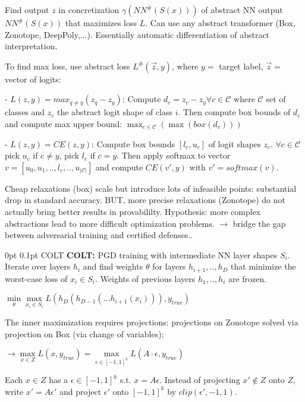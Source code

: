 \documentclass[11pt,landscape,a4paper,fleqn]{article}
\makeatletter
\renewcommand{\subsection}{\@startsection{subsection}{1}{0mm}%
                                {0pt}%
                                {0.1pt}%
                            	{\color{myorange2}\sffamily\small}}
\makeatother
\begin{document}
\begin{multicols*}{4}
Find output $z$ in concretization $\gamma(NN^\#(S(x)))$ of abstract NN output $NN^\#(S(x))$ that maximizes loss $L$. Can use any abstract transformer (Box, Zonotope, DeepPoly,...). {Essentially automatic differentiation of abstract interpretation.}

To find max loss, use abstract loss $L^\#(\vec{z}, y)$, where $y = $ target label, $\vec{z} = $ vector of logits:
\vspace*{1mm}

- $L(z, y) = max_{q \neq y} (z_q - z_y)$: Compute {$d_c = z_c - z_y \forall c \in \mathcal{C}$} where $\mathcal{C}$ set of classes and $z_c$ the abstract logit shape of class $i$. Then compute box bounds of $d_c$ and compute max upper bound: {$\max_{c \in \mathcal{C}}(\max(box(d_c)))$}

- $L(z,y) = CE(z,y)$: Compute box bounds $[l_c, u_c]$ of logit shapes $z_c$. $\forall c \in \mathcal{C}$ pick $u_c$ if $c \neq y$, pick $l_c$ if $c = y$. Then {apply softmax to vector $v = [u_0, u_1,.., l_c,.., u_{|\mathcal{C}|}]$ and compute $CE(v', y)$ with $v' = softmax(v)$.}

Cheap relaxations (box) scale but introduce lots of infeasible points: substantial drop in standard accuracy.
BUT, more precise relaxations (Zonotope) do not actually bring better results in provabililty. Hypothesis: more complex abstractions lead to more difficult optimization problems. $\rightarrow$ bridge the gap between adversarial training and certified defenses..
\vspace*{2mm}

\subsection{COLT}
\textbf{COLT:} PGD training with intermediate NN layer shapes $S_i$. Iterate over layers $h_i$ and find weights $\theta$ for layers $h_{i+1},..,h_D$ that minimize the worst-case loss of $x_i \in S_i$. Weights of previous layers $h_1,..,h_{i}$ are frozen.

{$\min\limits_\theta \max\limits_{x_i \in S_i} L(h_D(h_{D-1}(... h_{i+1}(x_i))), y_{true})$}

The inner maximization requires projections: projections on Zonotope solved via projection on Box (via change of variables):

$\rightarrow \max\limits_{x \in Z} L(x, y_{true}) = \max\limits_{\epsilon \in [-1,1]^k} L(A \cdot \epsilon, y_{true})$

Each $x \in Z$ has a $\epsilon \in [-1,1]^k$ s.t. $x = A \epsilon$. Instead of projecting $x' \notin Z$ onto $Z$, write $x' = A \epsilon'$ and project $\epsilon'$ onto $[-1,1]^k$ by $clip(\epsilon', -1, 1)$.


\end{multicols*}
\end{document}
